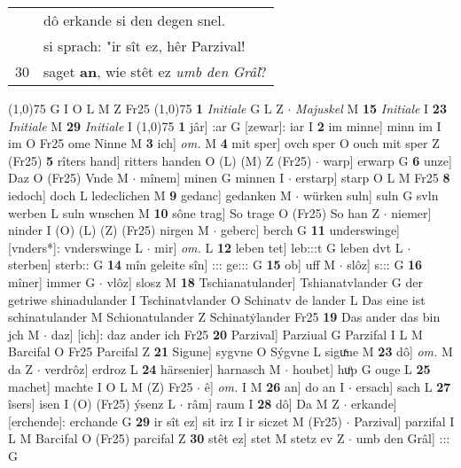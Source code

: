 \documentclass[8pt,a4paper,notitlepage]{article}
\begin{document}
\begin{table}[ht]
\begin{minipage}[t]{0.5\linewidth}
\begin{tabular}{rl}
 & dô erkande si den degen snel.\\ 
 & si sprach: "ir sît ez, hêr Parzival!\\ 
30 & saget \textbf{an}, wie stêt ez \textit{umb den} \textit{Grâl}?\\ 
\end{tabular}
\scriptsize
\line(1,0){75} \newline
G I O L M Z Fr25 \newline
\line(1,0){75} \newline
\textbf{1} \textit{Initiale} G L Z   $\cdot$ \textit{Majuskel} M  \textbf{15} \textit{Initiale} I  \textbf{23} \textit{Initiale} M  \textbf{29} \textit{Initiale} I  \newline
\line(1,0){75} \newline
\textbf{1} jâr] :ar G [zewar]: iar I \textbf{2} im minne] minn im I im O Fr25 ome Ninne M \textbf{3} ich] \textit{om.} M \textbf{4} mit sper] ovch sper O ouch mit sper Z (Fr25) \textbf{5} rîters hand] ritters handen O (L) (M) Z (Fr25)  $\cdot$ warp] erwarp G \textbf{6} unze] Daz O (Fr25) Vnde M  $\cdot$ mînem] minen G minnen I  $\cdot$ erstarp] starp O L M Fr25 \textbf{8} iedoch] doch L ledeclichen M \textbf{9} gedanc] gedanken M  $\cdot$ würken suln] suln G svln werben L suln wnschen M \textbf{10} sône trag] So trage O (Fr25) So han Z  $\cdot$ niemer] ninder I (O) (L) (Z) (Fr25) nirgen M  $\cdot$ geberc] berch G \textbf{11} underswinge] [vnders*]: vnderswinge L  $\cdot$ mir] \textit{om.} L \textbf{12} leben tet] leb:::t G leben dvt L  $\cdot$ sterben] sterb:: G \textbf{14} mîn geleite sîn] ::: ge::: G \textbf{15} ob] uff M  $\cdot$ slôz] s::: G \textbf{16} mîner] immer G  $\cdot$ vlôz] slosz M \textbf{18} Tschianatulander] Tshianatvlander G der getriwe shinadulander I Tschinatvlander O Schinatv de lander L Das eine ist schinatulander M Schionatulander Z Schinatẏlander Fr25 \textbf{19} Das ander das bin jch M  $\cdot$ daz] [ich]: daz ander ich Fr25 \textbf{20} Parzival] Parziual G Parzifal I L M Barcifal O Fr25 Parcifal Z \textbf{21} Sigune] sygvne O Sýgvne L siguͯne M \textbf{23} dô] \textit{om.} M da Z  $\cdot$ verdrôz] erdroz L \textbf{24} härsenier] harnasch M  $\cdot$ houbet] huͦp G ouge L \textbf{25} machet] machte I O L M (Z) Fr25  $\cdot$ ê] \textit{om.} I M \textbf{26} an] do an I  $\cdot$ ersach] sach L \textbf{27} îsers] isen I (O) (Fr25) ýsenz L  $\cdot$ râm] raum I \textbf{28} dô] Da M Z  $\cdot$ erkande] [erchende]: erchande G \textbf{29} ir sît ez] sit irz I ir siczet M (Fr25)  $\cdot$ Parzival] parzifal I L M Barcifal O (Fr25) parcifal Z \textbf{30} stêt ez] stet M stetz ev Z  $\cdot$ umb den Grâl] ::: G \newline

\end{minipage}
\end{table}
\end{document}
